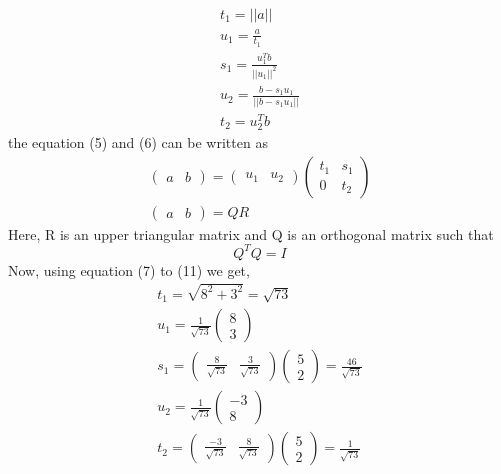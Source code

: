 \documentclass{article}
\begin{document}
\begin{gather}
    t_1 = ||a||\\
    u_1 = \frac{a}{t_1}\\
    s_1 = \frac{u_1^{T}b}{||u_1||^{2}}\\
    u_2 = \frac{b-s_1u_1}{||b-s_1u_1||}\\
    t_2 = u_2^{T}b
\end{gather}
the equation (5) and (6) can be written as \\
\begin{gather}
    \begin{pmatrix} a & b \end{pmatrix} = \begin{pmatrix} u_1 & u_2 \end{pmatrix} \begin{pmatrix}  t_1 & s_1 \\ 0 & t_2 \end{pmatrix}\\
    \begin{pmatrix} a & b \end{pmatrix} = QR
\end{gather}
Here, R is an upper triangular matrix and Q is
an orthogonal matrix such that \\ 
\begin{equation}
    Q^{T}Q = I
\end{equation}
Now, using equation (7) to (11) we get,
\begin{gather}
    t_1 = \sqrt{8^{2} + 3^{2}} = \sqrt{73} \\
    u_1 = \frac{1}{\sqrt{73}}\begin{pmatrix} 8 \\ 3 \end{pmatrix} \\
    s_1 = \begin{pmatrix} \frac{8}{\sqrt{73}} & \frac{3}{\sqrt{73}} \end{pmatrix}\begin{pmatrix} 5 \\ 2 \end{pmatrix} = \frac{46}{\sqrt{73}}\\
    u_2 = \frac{1}{\sqrt{73}}\begin{pmatrix}-3 \\ 8  \end{pmatrix}\\
    t_2 = \begin{pmatrix} \frac{-3}{\sqrt{73}}  & \frac{8}{\sqrt{73}}\end{pmatrix} \begin{pmatrix} 5 \\ 2 \end{pmatrix} = \frac{1}{\sqrt{73}}
\end{gather}
\end{document}
